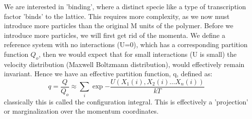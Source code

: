 We are interested in 'binding', where a distinct specie like a type of transcription factor 'binds' to the lattice.  This requires more complexity, as we now must introduce more particles than the original M units of the polymer.  Before we introduce more particles, we will first get rid of the momenta.  We define a reference system with no interactions (U=0), which has a corresponding partition function $Q_o$, then we would expect that for small interactions (U is small) the velocity distribution (Maxwell Boltzmann distribution), would effectively remain invariant.  Hence we have an effective partition function, q, defined as:
\begin{equation}\label{idealgasq}
  q = \frac{Q}{Q_o} \approx \sum_i \exp{-\frac{U(X_1(i), X_2(i)\dotsc X_n(i))}{kT} }
  \end{equation}
classically this is called the configuration integral.  This is effectively a 'projection' or marginalization over the momentum coordinates.